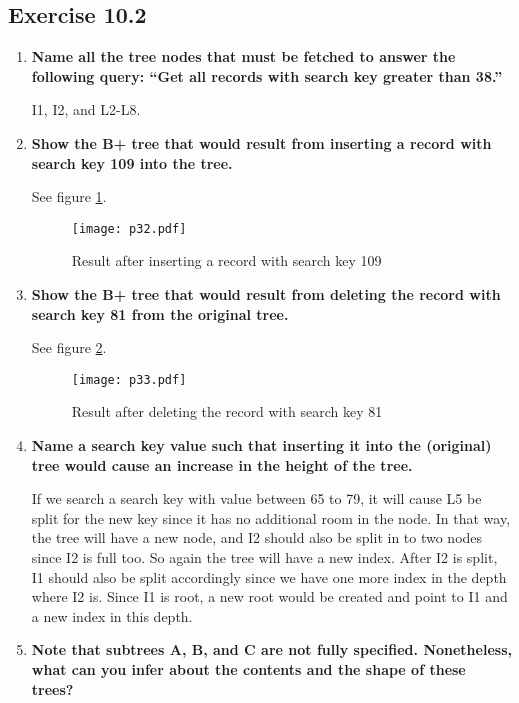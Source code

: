 \subsection{Exercise 10.2}
\begin{enumerate}
\item {\bf Name all the tree nodes that must be fetched to answer the following query: ``Get all records with search key greater than 38.''}

I1, I2, and L2-L8.

\item {\bf Show the B+ tree that would result from inserting a record with search key 109 into the tree.}

See figure \ref{p32}.

\begin{figure}[h]
\begin{center}
\texttt{[image: p32.pdf]}
\end{center}
\caption{Result after inserting a record with search key 109}
\label{p32}
\end{figure}

\item {\bf Show the B+ tree that would result from deleting the record with search key 81 from the original tree.}

See figure \ref{p33}.

\begin{figure}[h]
\begin{center}
\texttt{[image: p33.pdf]}
\end{center}
\caption{Result after deleting the record with search key 81}
\label{p33}
\end{figure}

\item {\bf Name a search key value such that inserting it into the (original) tree would cause an increase in the height of the tree.}

If we search a search key with value between 65 to 79, it will cause L5 be split for the new key since it has no additional room in the node.  In that way, the tree will have a new node, and I2 should also be split in to two nodes since I2 is full too.  So again the tree will have a new index.  After I2 is split, I1 should also be split accordingly since we have one more index in the depth where I2 is.  Since I1 is root, a new root would be created and point to I1 and a new index in this depth.

\item {\bf Note that subtrees A, B, and C are not fully specified. Nonetheless, what can you infer about the contents and the shape of these trees?}


\end{enumerate}
